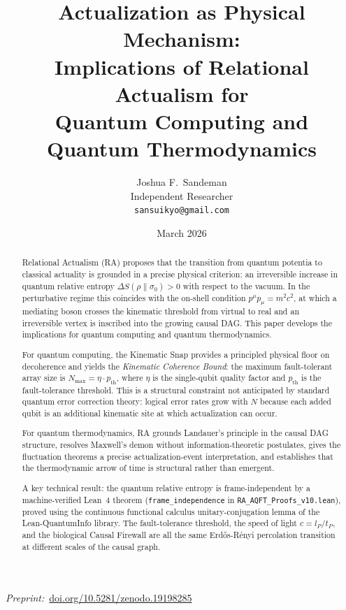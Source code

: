 \documentclass[11pt,a4paper]{article}
\theoremstyle{plain}
\theoremstyle{definition}
\theoremstyle{remark}
\begin{document}
\title{\textbf{Actualization as Physical Mechanism: \\
Implications of Relational Actualism for \\
Quantum Computing and Quantum Thermodynamics}}

\author{Joshua F.\ Sandeman \\
\small Independent Researcher \\
\small \texttt{sansuikyo@gmail.com}}

\date{March 2026}

\maketitle
\begin{center}
  {\small\textit{Preprint:}~\href{https://doi.org/10.5281/zenodo.19198285}
    {doi.org/10.5281/zenodo.19198285}\par}
\end{center}

\begin{abstract}
Relational Actualism (RA) proposes that the transition from quantum potentia to
classical actuality is grounded in a precise physical criterion: an irreversible
increase in quantum relative entropy $\Delta S(\rho\|\sigma_0) > 0$ with respect
to the vacuum. In the perturbative regime this coincides with the on-shell
condition $p^\mu p_\mu = m^2c^2$, at which a mediating boson crosses the
kinematic threshold from virtual to real and an irreversible vertex is inscribed
into the growing causal DAG. This paper develops the implications for quantum
computing and quantum thermodynamics.

For quantum computing, the Kinematic Snap provides a principled physical floor
on decoherence and yields the \emph{Kinematic Coherence Bound}: the maximum
fault-tolerant array size is $N_{\max} = \eta \cdot p_{\mathrm{th}}$,
where $\eta$ is the single-qubit quality factor and $p_{\mathrm{th}}$ is the
fault-tolerance threshold. This is a structural constraint not anticipated by
standard quantum error correction theory: logical error rates grow with $N$
because each added qubit is an additional kinematic site at which actualization
can occur.

For quantum thermodynamics, RA grounds Landauer's principle in the causal DAG
structure, resolves Maxwell's demon without information-theoretic postulates,
gives the fluctuation theorems a precise actualization-event interpretation, and
establishes that the thermodynamic arrow of time is structural rather than emergent.

A key technical result: the quantum relative entropy is frame-independent by a
machine-verified Lean~4 theorem (\texttt{frame\_independence} in
\texttt{RA\_AQFT\_Proofs\_v10.lean}), proved using the continuous functional
calculus unitary-conjugation lemma of the Lean-QuantumInfo library. The
fault-tolerance threshold, the speed of light $c = l_P/t_P$, and the biological
Causal Firewall are all the same Erd\H{o}s-R\'{e}nyi percolation transition
at different scales of the causal graph.

\end{abstract}
\end{document}
